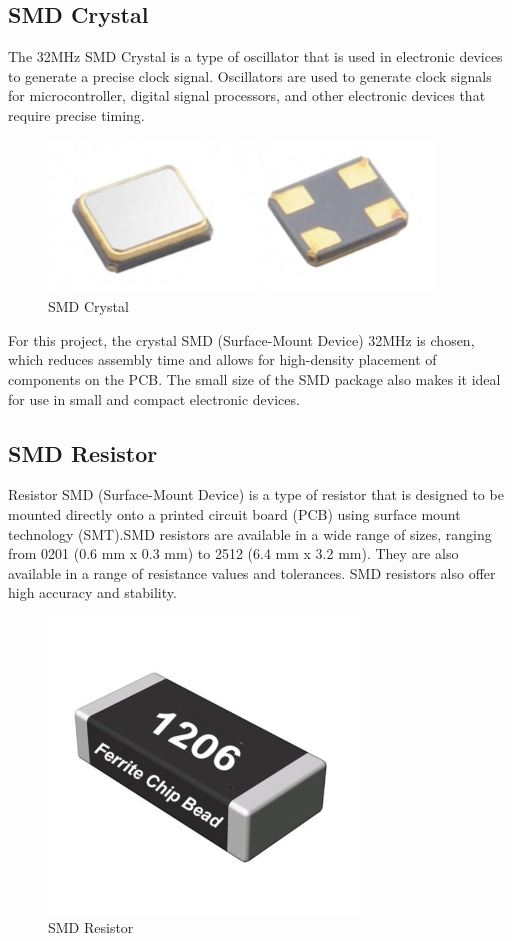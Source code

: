 \documentclass[a4paper, twoside]{report}
\begin{document}
\subsection{SMD Crystal}
The 32MHz SMD Crystal is a type of oscillator that is used in electronic devices to generate a precise clock signal. Oscillators are used to generate clock signals for microcontroller, digital signal processors, and other electronic devices that require precise timing.
\begin{figure}[H]
    \begin{center}
    \includegraphics[width=.5\textwidth]{images/crystal.png}
    \caption{SMD Crystal}
    \end{center} 
\end{figure} 
For this project, the crystal SMD (Surface-Mount Device) 32MHz is chosen, which reduces assembly time and allows for high-density placement of components on the PCB. The small size of the SMD package also makes it ideal for use in small and compact electronic devices.

\subsection{SMD Resistor}
Resistor SMD (Surface-Mount Device) is a type of resistor that is designed to be mounted directly onto a printed circuit board (PCB) using surface mount technology (SMT).SMD resistors are available in a wide range of sizes, ranging from 0201 (0.6 mm x 0.3 mm) to 2512 (6.4 mm x 3.2 mm). They are also available in a range of resistance values and tolerances. SMD resistors also offer high accuracy and stability.

\begin{figure}[H]
    \begin{center}
    \includegraphics[trim=0cm 1cm 0cm 1cm,clip,width=.25\textwidth]{images/Resistor.png}
    \caption{SMD Resistor}
    \end{center} 
\end{figure} 
 
\end{document}
